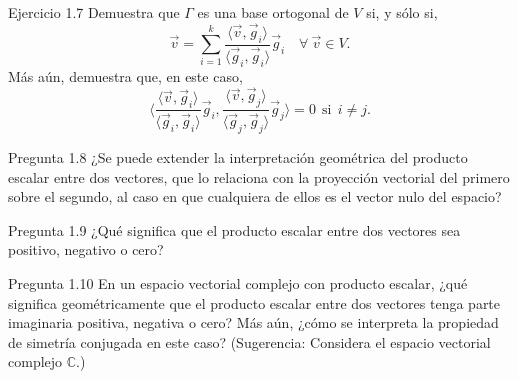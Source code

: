 \documentclass[12pt,dvipsnames]{article}
\numberwithin{equation}{section}
\begin{document}
Ejercicio 1.7 Demuestra que $\Gamma$ es una base ortogonal de $V$ si, y sólo si, 
\[
    \vec{v} = \sum_{i=1}^k \frac{\langle \vec{v} , \vec{g}_i \rangle}{\langle \vec{g}_i , \vec{g}_i \rangle} \vec{g}_i \quad \forall \ \vec{v}\in V.
\]
\noindent Más aún, demuestra que, en este caso,
\[
\bigg\langle \frac{\langle \vec{v} , \vec{g}_i \rangle}{\langle \vec{g}_i , \vec{g}_i \rangle} \vec{g}_i, \frac{\langle \vec{v} , \vec{g}_j \rangle}{\langle \vec{g}_j , \vec{g}_j \rangle} \vec{g}_j \bigg \rangle = 0 \ \ \text{si} \ \ i\neq j.
\] 

Pregunta 1.8 ¿Se puede extender la interpretación geométrica del producto escalar entre dos vectores, que lo relaciona con la proyección vectorial del primero sobre el segundo, al caso en que cualquiera de ellos es el vector nulo del espacio?

Pregunta 1.9 ¿Qué significa que el producto escalar entre dos vectores sea positivo, negativo o cero? 

Pregunta 1.10 En un espacio vectorial complejo con producto escalar, ¿qué significa geométricamente que el producto escalar entre dos vectores tenga parte imaginaria positiva, negativa o cero? Más aún, ¿cómo se interpreta la propiedad de simetría conjugada en este caso? (Sugerencia: Considera el espacio vectorial complejo $\mathbb{C}$.) \\ 
\end{document}
